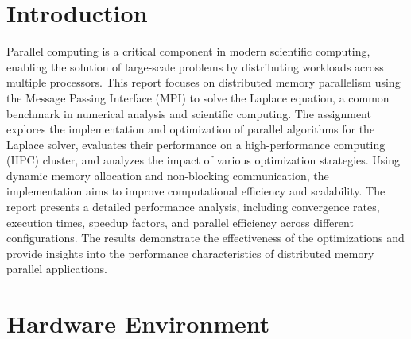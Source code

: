 \documentclass[11pt]{article}
\begin{document}






%








\section{Introduction}
Parallel computing is a critical component in modern scientific computing, enabling the solution of large-scale problems by distributing workloads across multiple processors. This report focuses on distributed memory parallelism using the Message Passing Interface (MPI) to solve the Laplace equation, a common benchmark in numerical analysis and scientific computing. The assignment explores the implementation and optimization of parallel algorithms for the Laplace solver, evaluates their performance on a high-performance computing (HPC) cluster, and analyzes the impact of various optimization strategies.
Using dynamic memory allocation and non-blocking communication, the implementation aims to improve computational efficiency and scalability. The report presents a detailed performance analysis, including convergence rates, execution times, speedup factors, and parallel efficiency across different configurations. The results demonstrate the effectiveness of the optimizations and provide insights into the performance characteristics of distributed memory parallel applications.

\section{Hardware Environment}
\end{document}
